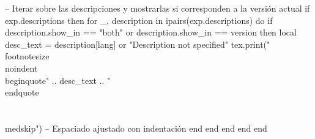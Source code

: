 \begin{luacode}
        -- Iterar sobre las descripciones y mostrarlas si corresponden a la versión actual
        if exp.descriptions then
            for _, description in ipairs(exp.descriptions) do
                if description.show_in == "both" or description.show_in == version then
                    local desc_text = description[lang] or "Description not specified"
                    tex.print("{\\footnotesize \\noindent\\begin{quote}" .. desc_text .. "\\end{quote}}\\\\ \\medskip") -- Espaciado ajustado con indentación
                end
            end
        end
    end
end
\end{luacode}
